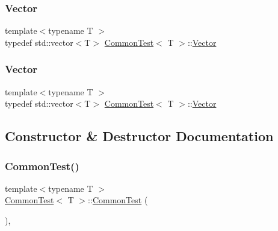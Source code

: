 \subsubsection{\texorpdfstring{Vector}{Vector}\hspace{0.1cm}{\footnotesize\ttfamily [2/3]}}
{\footnotesize\ttfamily template$<$typename T $>$ \\
typedef std\+::vector$<$T$>$ \mbox{\hyperlink{class_common_test}{Common\+Test}}$<$ T $>$\+::\mbox{\hyperlink{class_common_test_a6dfdcede6964887b9f4254a0e0478e37}{Vector}}\hspace{0.3cm}{\ttfamily [protected]}}

\mbox{\label{class_common_test_a6dfdcede6964887b9f4254a0e0478e37}} 
\subsubsection{\texorpdfstring{Vector}{Vector}\hspace{0.1cm}{\footnotesize\ttfamily [3/3]}}
{\footnotesize\ttfamily template$<$typename T $>$ \\
typedef std\+::vector$<$T$>$ \mbox{\hyperlink{class_common_test}{Common\+Test}}$<$ T $>$\+::\mbox{\hyperlink{class_common_test_a6dfdcede6964887b9f4254a0e0478e37}{Vector}}\hspace{0.3cm}{\ttfamily [protected]}}



\subsection{Constructor \& Destructor Documentation}
\mbox{\label{class_common_test_abd5ec205d90f4b81efab2a6f972f3db0}} 
\subsubsection{\texorpdfstring{CommonTest()}{CommonTest()}\hspace{0.1cm}{\footnotesize\ttfamily [1/3]}}
{\footnotesize\ttfamily template$<$typename T $>$ \\
\mbox{\hyperlink{class_common_test}{Common\+Test}}$<$ T $>$\+::\mbox{\hyperlink{class_common_test}{Common\+Test}} (\begin{DoxyParamCaption}{ }\end{DoxyParamCaption})\hspace{0.3cm}{\ttfamily [inline]}, {\ttfamily [protected]}}

